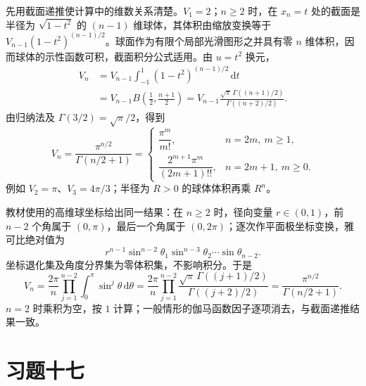 \begin{solve}
先用截面递推使计算中的维数关系清楚。$V_1=2$；$n\geq2$ 时，在 $x_n=t$ 处的截面是半径为 $\sqrt{1-t^2}$ 的 $(n-1)$ 维球体，其体积由缩放变换等于 $V_{n-1}(1-t^2)^{(n-1)/2}$。球面作为有限个局部光滑图形之并具有零 $n$ 维体积，因而球体的示性函数可积，截面积分公式适用。由 $u=t^2$ 换元，
\begin{align*}
    V_n&=V_{n-1}\int_{-1}^1(1-t^2)^{(n-1)/2}\,\mathrm{d}t\\
       &=V_{n-1}B\left(\frac12,\frac{n+1}{2}\right)
        =V_{n-1}\frac{\sqrt\pi\,\Gamma((n+1)/2)}{\Gamma((n+2)/2)}.
\end{align*}
由归纳法及 $\Gamma(3/2)=\sqrt\pi/2$，得到
\begin{equation}
    V_n=\frac{\pi^{n/2}}{\Gamma(n/2+1)}
    =\begin{cases}
       \dfrac{\pi^m}{m!},&n=2m,\ m\geq1,\\
       \dfrac{2^{m+1}\pi^m}{(2m+1)!!},&n=2m+1,\ m\geq0.
     \end{cases}
    \label{eq:gamma-unit-ball-volume}
\end{equation}
例如 $V_2=\pi$、$V_3=4\pi/3$；半径为 $R>0$ 的球体体积再乘 $R^n$。

教材使用的高维球坐标给出同一结果：在 $n\geq2$ 时，径向变量 $r\in(0,1)$，前 $n-2$ 个角属于 $(0,\pi)$，最后一个角属于 $(0,2\pi)$；逐次作平面极坐标变换，雅可比绝对值为
\[
    r^{n-1}\sin^{n-2}\theta_1\sin^{n-3}\theta_2\cdots\sin\theta_{n-2}.
\]
坐标退化集及角度分界集为零体积集，不影响积分。于是
\[
    V_n=\frac{2\pi}{n}\prod_{j=1}^{n-2}
         \int_0^\pi\sin^j\theta\,\mathrm{d}\theta
       =\frac{2\pi}{n}\prod_{j=1}^{n-2}
         \frac{\sqrt\pi\,\Gamma((j+1)/2)}{\Gamma((j+2)/2)}
       =\frac{\pi^{n/2}}{\Gamma(n/2+1)}.
\]
$n=2$ 时乘积为空，按 $1$ 计算；一般情形的伽马函数因子逐项消去，与截面递推结果一致。
\end{solve}

\section*{习题十七}
